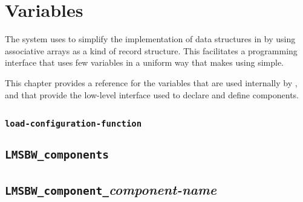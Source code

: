 \chapter{Variables}

The \lmsbw system uses \gmsl to simplify the implementation of data
structures in \make by using associative arrays as a kind of record
structure.  This facilitates a programming interface that uses few
variables in a uniform way that makes using \lmsbw simple.

This chapter provides a reference for the variables that are used
internally by \lmsbw, and that provide the low-level interface used to
declare and define components.

\section{\lmsbwconfiguration}
\subsection{\texttt{load-configuration-function}}

\section{\texttt{LMSBW\_components}}

\section{\texttt{LMSBW\_component\_}\emph{component-name}}
